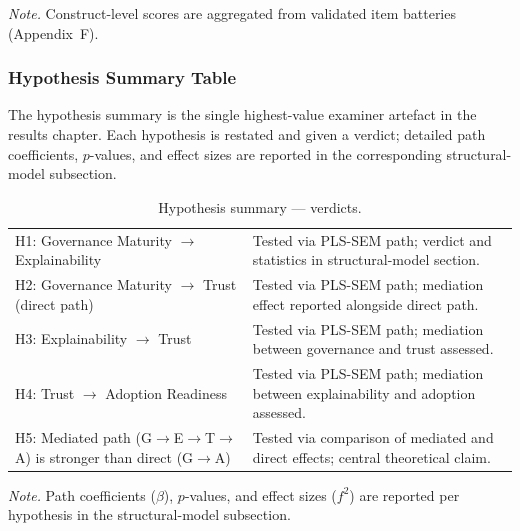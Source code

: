 \vspace{0.3em}\noindent\textit{Note.} Construct-level scores are aggregated from validated item batteries (Appendix~F).


\subsubsection{Hypothesis Summary Table}
\label{sec:ch4_hypothesis_summary}

\noindent The hypothesis summary is the single highest-value examiner artefact in the results chapter. Each hypothesis is restated and given a verdict; detailed path coefficients, $p$-values, and effect sizes are reported in the corresponding structural-model subsection.

{\tablestripes\tablefontsize
{}
\begin{xltabular}{\textwidth}{@{} >{\raggedright\arraybackslash}p{5cm} L @{}}
\caption[Hypothesis summary --- verdicts]{Hypothesis summary --- verdicts.}\label{tab:ch4_hypothesis_summary} \\
\toprule
{} &  \\
\midrule
\endfirsthead
\endhead
\bottomrule
\endlastfoot
H1: Governance Maturity $\rightarrow$ Explainability & Tested via PLS-SEM path; verdict and statistics in structural-model section. \\
\addlinespace
H2: Governance Maturity $\rightarrow$ Trust (direct path) & Tested via PLS-SEM path; mediation effect reported alongside direct path. \\
\addlinespace
H3: Explainability $\rightarrow$ Trust & Tested via PLS-SEM path; mediation between governance and trust assessed. \\
\addlinespace
H4: Trust $\rightarrow$ Adoption Readiness & Tested via PLS-SEM path; mediation between explainability and adoption assessed. \\
\addlinespace
H5: Mediated path (G$\rightarrow$E$\rightarrow$T$\rightarrow$A) is stronger than direct (G$\rightarrow$A) & Tested via comparison of mediated and direct effects; central theoretical claim. \\
\end{xltabular}}

\vspace{0.3em}\noindent\textit{Note.} Path coefficients ($\beta$), $p$-values, and effect sizes ($f^2$) are reported per hypothesis in the structural-model subsection.


